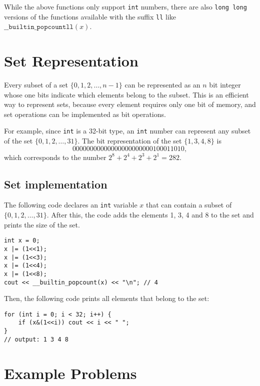 \documentclass[twoside,12pt,a4paper,english]{book}
\theoremstyle{definition}
\theoremstyle{problemstyle}
\theoremstyle{problemstyle}
\theoremstyle{problemstyle}
\begin{document}
While the above functions only support \texttt{int} numbers,
there are also \texttt{long long} versions of
the functions available with the suffix \texttt{ll} like $\texttt{\_\_builtin\_popcountll}(x)$.
\section{Set Representation}
Every subset of a set
$\{0,1,2,\ldots,n-1\}$
can be represented as an $n$ bit integer
whose one bits indicate which
elements belong to the subset.
This is an efficient way to represent sets,
because every element requires only one bit of memory,
and set operations can be implemented as bit operations.

For example, since \texttt{int} is a 32-bit type,
an \texttt{int} number can represent any subset
of the set $\{0,1,2,\ldots,31\}$.
The bit representation of the set $\{1,3,4,8\}$ is
\[00000000000000000000000100011010,\]
which corresponds to the number $2^8+2^4+2^3+2^1=282$.

\subsection{Set implementation}

The following code declares an \texttt{int}
variable $x$ that can contain
a subset of $\{0,1,2,\ldots,31\}$.
After this, the code adds the elements 1, 3, 4 and 8
to the set and prints the size of the set.
\begin{lstlisting}
int x = 0;
x |= (1<<1);
x |= (1<<3);
x |= (1<<4);
x |= (1<<8);
cout << __builtin_popcount(x) << "\n"; // 4
\end{lstlisting}
Then, the following code prints all
elements that belong to the set:
\begin{lstlisting}
for (int i = 0; i < 32; i++) {
    if (x&(1<<i)) cout << i << " ";
}
// output: 1 3 4 8
\end{lstlisting}

\section{Example Problems}
\end{document}
